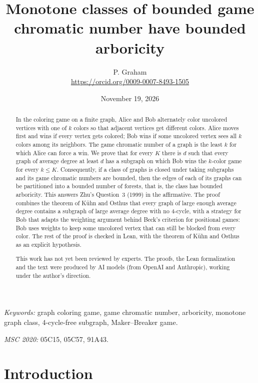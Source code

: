 \documentclass[11pt]{article}
\title{Monotone classes of bounded game chromatic number have bounded arboricity}
\author{P. Graham\\ \small\url{https://orcid.org/0009-0007-8493-1505}}
\date{November 19, 2026}
\theoremstyle{remark}
\begin{document}
\maketitle
\begin{abstract}
In the coloring game on a finite graph, Alice and Bob alternately color
uncolored vertices with one of $k$ colors so that adjacent vertices get
different colors. Alice moves first and wins if every vertex gets colored;
Bob wins if some uncolored vertex sees all $k$ colors among its neighbors.
The game chromatic number of a graph is the least $k$ for which Alice can
force a win. We prove that for every $K$ there is $d$ such that every graph
of average degree at least $d$ has a subgraph on which Bob wins the
$k$-color game for every $k\le K$. Consequently, if a class of graphs is
closed under taking subgraphs and its game chromatic numbers are bounded,
then the edges of each of its graphs can be partitioned into a bounded
number of forests, that is, the class has bounded arboricity. This answers
Zhu's Question~3 (1999) in the affirmative. The proof combines the theorem of Kühn and Osthus
that every graph of large enough average degree contains a subgraph of
large average degree with no 4-cycle, with a strategy for Bob that adapts
the weighting argument behind Beck's criterion for positional games: Bob
uses weights to keep some uncolored vertex that can still be blocked from
every color. The rest of the proof is checked in Lean, with the theorem of
Kühn and Osthus as an explicit hypothesis.

This work has not yet been reviewed by experts.
The proofs, the Lean formalization and the text were produced by AI models
(from OpenAI and Anthropic), working under the author's direction.
\end{abstract}
\medskip
\noindent\textit{Keywords:} graph coloring game, game chromatic number,
arboricity, monotone graph class, 4-cycle-free subgraph, Maker--Breaker
game.

\noindent\textit{MSC 2020:} 05C15, 05C57, 91A43.

\section{Introduction}
\end{document}
